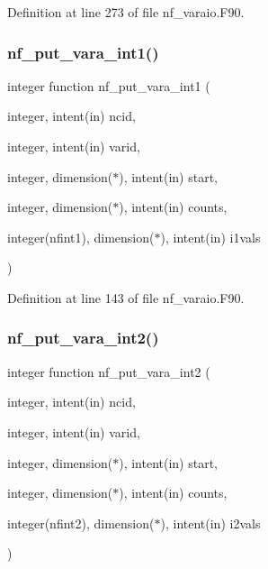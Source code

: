 Definition at line 273 of file nf\+\_\+varaio.\+F90.

\mbox{\label{nf__varaio_8F90_a2fbb5c5ffd0ed04601345f3eb7084193}} 
\subsubsection{\texorpdfstring{nf\+\_\+put\+\_\+vara\+\_\+int1()}{nf\_put\_vara\_int1()}}
{\footnotesize\ttfamily integer function nf\+\_\+put\+\_\+vara\+\_\+int1 (\begin{DoxyParamCaption}\item[{integer, intent(in)}]{ncid,  }\item[{integer, intent(in)}]{varid,  }\item[{integer, dimension($\ast$), intent(in)}]{start,  }\item[{integer, dimension($\ast$), intent(in)}]{counts,  }\item[{integer(nfint1), dimension($\ast$), intent(in)}]{i1vals }\end{DoxyParamCaption})}



Definition at line 143 of file nf\+\_\+varaio.\+F90.

\mbox{\label{nf__varaio_8F90_aa79663ed582deecc83cc5b00a4c68249}} 
\subsubsection{\texorpdfstring{nf\+\_\+put\+\_\+vara\+\_\+int2()}{nf\_put\_vara\_int2()}}
{\footnotesize\ttfamily integer function nf\+\_\+put\+\_\+vara\+\_\+int2 (\begin{DoxyParamCaption}\item[{integer, intent(in)}]{ncid,  }\item[{integer, intent(in)}]{varid,  }\item[{integer, dimension($\ast$), intent(in)}]{start,  }\item[{integer, dimension($\ast$), intent(in)}]{counts,  }\item[{integer(nfint2), dimension($\ast$), intent(in)}]{i2vals }\end{DoxyParamCaption})}




